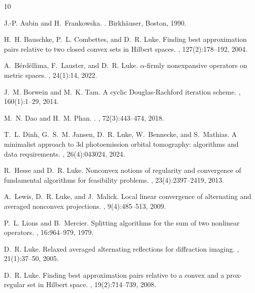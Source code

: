 \documentclass[12pt]{article}
\theoremstyle{definition}
\begin{document}
\begin{thebibliography}{10}

J.-P. Aubin and H.~Frankowska.
.
\newblock Birkh{\"{a}}user, Boston, 1990.

H.~H. Bauschke, P.~L. Combettes, and D.~R. Luke.
\newblock Finding best approximation pairs relative to two closed convex sets
  in {H}ilbert spaces.
, 127(2):178--192, 2004.

A.~B{\"e}rd{\"e}llima, F.~Lauster, and D.~R. Luke.
\newblock $\alpha$-firmly nonexpansive operators on metric spaces.
, 24(1):14, 2022.

J.~M. Borwein and M.~K. Tam.
\newblock A cyclic {Douglas}-{Rachford} iteration scheme.
, 160(1):1--29, 2014.

M.~N. {Dao} and H.~M. {Phan}.
.
, 72(3):443--474, 2018.

T.~L. Dinh, G.~S.~M. Jansen, D.~R. Luke, W.~Bennecke, and S.~Mathias.
\newblock A minimalist approach to 3d photoemission orbital tomography:
  algorithms and data requirements.
, 26(4):043024, 2024.

R.~Hesse and D.~R. Luke.
\newblock Nonconvex notions of regularity and convergence of fundamental
  algorithms for feasibility problems.
, 23(4):2397--2419, 2013.

A.~Lewis, D.~R. Luke, and J.~Malick.
\newblock Local linear convergence of alternating and averaged nonconvex
  projections.
, 9(4):485--513, 2009.

P.~L. Lions and B.~Mercier.
\newblock Splitting algorithms for the sum of two nonlinear operators.
, 16:964--979, 1979.

D.~R. Luke.
\newblock Relaxed averaged alternating reflections for diffraction imaging.
, 21(1):37--50, 2005.

D.~R. Luke.
\newblock Finding best approximation pairs relative to a convex and a
  prox-regular set in {H}ilbert space.
, 19(2):714--739, 2008.


\end{thebibliography}
\end{document}
